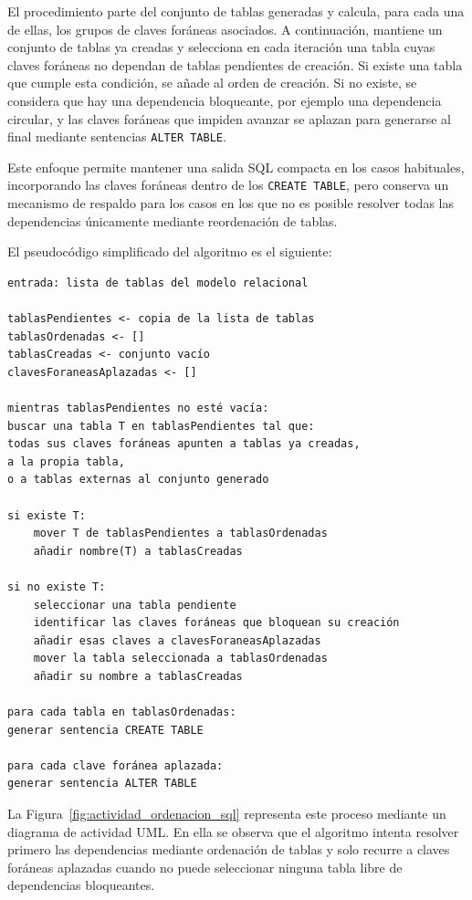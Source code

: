 El procedimiento parte del conjunto de tablas generadas y calcula, para cada una de ellas, los grupos de claves foráneas asociados. A continuación, mantiene un conjunto de tablas ya creadas y selecciona en cada iteración una tabla cuyas claves foráneas no dependan de tablas pendientes de creación. Si existe una tabla que cumple esta condición, se añade al orden de creación. Si no existe, se considera que hay una dependencia bloqueante, por ejemplo una dependencia circular, y las claves foráneas que impiden avanzar se aplazan para generarse al final mediante sentencias \texttt{ALTER TABLE}.

Este enfoque permite mantener una salida SQL compacta en los casos habituales, incorporando las claves foráneas dentro de los \texttt{CREATE TABLE}, pero conserva un mecanismo de respaldo para los casos en los que no es posible resolver todas las dependencias únicamente mediante reordenación de tablas.

El pseudocódigo simplificado del algoritmo es el siguiente:

\begin{verbatim}
entrada: lista de tablas del modelo relacional

tablasPendientes <- copia de la lista de tablas
tablasOrdenadas <- []
tablasCreadas <- conjunto vacío
clavesForaneasAplazadas <- []

mientras tablasPendientes no esté vacía:
buscar una tabla T en tablasPendientes tal que:
todas sus claves foráneas apunten a tablas ya creadas,
a la propia tabla,
o a tablas externas al conjunto generado

si existe T:
    mover T de tablasPendientes a tablasOrdenadas
    añadir nombre(T) a tablasCreadas

si no existe T:
    seleccionar una tabla pendiente
    identificar las claves foráneas que bloquean su creación
    añadir esas claves a clavesForaneasAplazadas
    mover la tabla seleccionada a tablasOrdenadas
    añadir su nombre a tablasCreadas

para cada tabla en tablasOrdenadas:
generar sentencia CREATE TABLE

para cada clave foránea aplazada:
generar sentencia ALTER TABLE
\end{verbatim}

La Figura~\ref{fig:actividad_ordenacion_sql} representa este proceso mediante un diagrama de actividad UML. En ella se observa que el algoritmo intenta resolver primero las dependencias mediante ordenación de tablas y solo recurre a claves foráneas aplazadas cuando no puede seleccionar ninguna tabla libre de dependencias bloqueantes.

